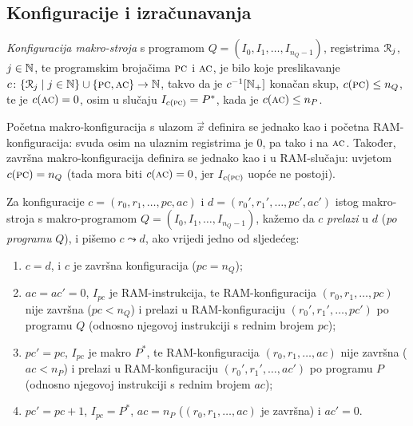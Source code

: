 \subsection{Konfiguracije i izračunavanja}
\begin{definicija}\label{def:macroconf}
\emph{Konfiguracija makro-stroja} s programom $Q=(I_0,I_1,\dotsc,I_{n_Q-1})$, registrima $\mathcal R_{j}$, $j\in{\mathbb N}$, te programskim brojačima $\textsc{pc}$ i $\textsc{ac}$, je bilo koje preslikavanje $c\colon\{\mathcal R_{j}\mid j\in{\mathbb N}\}\cup\{\textsc{pc},\textsc{ac}\}\to{\mathbb N}$, takvo da je $c^{-1}[{\mathbb N}_+]$ konačan skup, $c(\textsc{pc})\le n_Q$, te je $c(\textsc{ac})=0$, osim u slučaju $I_{c(\textsc{pc})}=P^*$, kada je $c(\textsc{ac})\le n_P$.

Početna makro-konfiguracija s ulazom $\vec x$ definira se jednako kao i početna RAM-konfiguracija: svuda osim na ulaznim registrima je $0$, pa tako i na $\textsc{ac}$. Također, završna makro-konfiguracija definira se jednako kao i u RAM-slučaju: uvjetom $c(\textsc{pc})=n_Q$ (tada mora biti $c(\textsc{ac})=0$, jer $I_{c(\textsc{pc})}$ uopće ne postoji).
\end{definicija}

\begin{definicija}\label{def:makrolead}
Za konfiguracije $c=(r_0,r_1,\dotsc,pc,ac)$ i $d=(r_0',r_1',\dotsc,pc',ac')$ istog makro-stroja s makro-programom $Q=(I_0,I_1,\dotsc,I_{n_Q-1})$, kažemo da $c$ \emph{prelazi} u $d$ (\emph{po programu} $Q$), i pišemo $c\leadsto d$, ako vrijedi jedno od sljedećeg:
\begin{enumerate}
    \item\label{stav:zav} $c=d$, i $c$ je završna konfiguracija ($pc=n_Q$);
    \item\label{stav:Q} $ac=ac'=0$, $I_{pc}$ je RAM-instrukcija, te RAM-konfiguracija $(r_0,r_1,\dotsc,pc)$ nije završna ($pc<n_Q$) i prelazi u RAM-konfiguraciju $(r_0',r_1',\dotsc,pc')$ po programu $Q$ (odnosno njegovoj instrukciji s rednim brojem $pc$);
    \item\label{stav:P} $pc'=pc$, $I_{pc}$ je makro $P^*$, te RAM-konfiguracija $(r_0,r_1,\dotsc,ac)$ nije završna ($ac<n_P$) i prelazi u RAM-konfiguraciju $(r_0',r_1',\dotsc,ac')$ po programu $P$ (odnosno njegovoj instrukciji s rednim brojem $ac$);
    \item\label{stav:carry} $pc'=pc+1$, $I_{pc}=P^*$, $ac=n_P$ ($(r_0,r_1,\dotsc,ac)$ je završna) i $ac'=0$.\qedhere
\end{enumerate}
\end{definicija}

